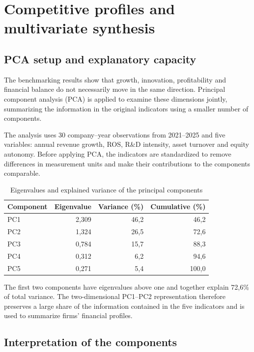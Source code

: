 \documentclass[11pt,a4paper]{article}
\begin{document}
\section{Competitive profiles and multivariate synthesis}

\subsection{PCA setup and explanatory capacity}

The benchmarking results show that growth, innovation, profitability and financial balance do not necessarily move in the same direction. Principal component analysis (PCA) is applied to examine these dimensions jointly, summarizing the information in the original indicators using a smaller number of components.

The analysis uses 30 company--year observations from 2021--2025 and five variables: annual revenue growth, ROS, R\&D intensity, asset turnover and equity autonomy. Before applying PCA, the indicators are standardized to remove differences in measurement units and make their contributions to the components comparable.

\begin{table}[H]
\centering
\caption{Eigenvalues and explained variance of the principal components}
\small
\begin{tabular}{lrrr}
\toprule
\textbf{Component} & \textbf{Eigenvalue} & \textbf{Variance (\%)} & \textbf{Cumulative (\%)} \\
\midrule
PC1 & 2,309 & 46,2 & 46,2 \\
PC2 & 1,324 & 26,5 & 72,6 \\
PC3 & 0,784 & 15,7 & 88,3 \\
PC4 & 0,312 & 6,2 & 94,6 \\
PC5 & 0,271 & 5,4 & 100,0 \\
\bottomrule
\end{tabular}
\end{table}

The first two components have eigenvalues above one and together explain 72,6\% of total variance. The two-dimensional PC1--PC2 representation therefore preserves a large share of the information contained in the five indicators and is used to summarize firms' financial profiles.

\subsection{Interpretation of the components}
\end{document}
